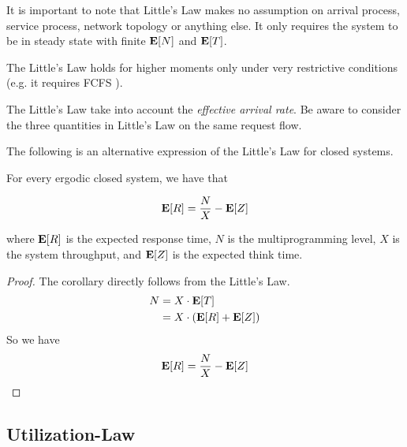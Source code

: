 It is important to note that Little's Law makes no assumption on arrival process, service process, network topology or anything else. It only requires the system to be in steady state with finite $\mathbf{E}[N]$ and $\mathbf{E}[T]$.

The Little's Law holds for higher moments only under very restrictive conditions (e.g. it requires FCFS \cite{bertsimas1995distributional,brumelle1972generalization}).

The Little's Law take into account the \textit{effective arrival rate}. Be aware to consider the three quantities in Little's Law on the same request flow.

The following is an alternative expression of the Little's Law for closed systems.

\begin{corollary}
\label{cor:Response-Time-Law-Closed-Systems}
	
	For every ergodic closed system, we have that
	
	\begin{equation}
	\label{eqn:Response-Time-Law-Closed-Systems}
	\expected{R} = \frac{N}{X} - \expected{Z}
	\end{equation}
	
	where 
	$\mathbf{E}[R]$ is the expected response time,
	$N$ is the multiprogramming level,
	$X$ is the system throughput, and
	$\mathbf{E}[Z]$ is the expected think time.
	
	\begin{proof}
		The corollary directly follows from the Little's Law.
		\begin{equation*}
		\begin{split}
		N & = X \cdot \mathbf{E}[T] \\
		& = X \cdot (\mathbf{E}[R] + \mathbf{E}[Z]) 
		\end{split}
		\end{equation*}
		So we have
		\begin{equation*}
		\mathbf{E}[R] = \frac{N}{X} - \mathbf{E}[Z]
		\end{equation*}
	\end{proof}
\end{corollary}




\subsection{Utilization-Law}
\label{sec:Utilization-Law}

